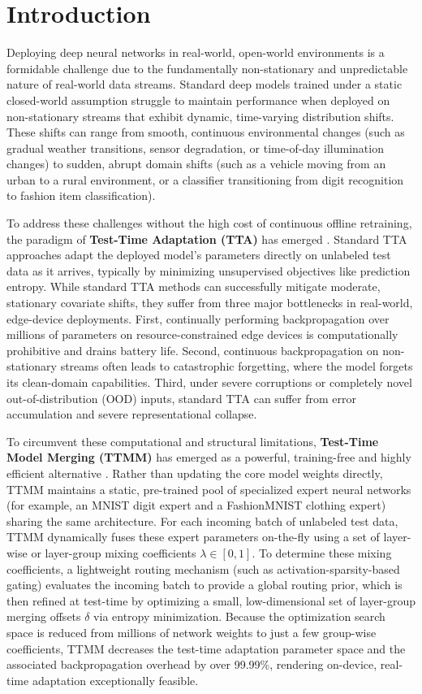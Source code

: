 \documentclass{article}
\theoremstyle{plain}
\theoremstyle{definition}
\theoremstyle{remark}
\begin{document}
\section{Introduction}
\label{sec:intro}
Deploying deep neural networks in real-world, open-world environments is a formidable challenge due to the fundamentally non-stationary and unpredictable nature of real-world data streams. Standard deep models trained under a static closed-world assumption struggle to maintain performance when deployed on non-stationary streams that exhibit dynamic, time-varying distribution shifts. These shifts can range from smooth, continuous environmental changes (such as gradual weather transitions, sensor degradation, or time-of-day illumination changes) to sudden, abrupt domain shifts (such as a vehicle moving from an urban to a rural environment, or a classifier transitioning from digit recognition to fashion item classification). 

To address these challenges without the high cost of continuous offline retraining, the paradigm of \textbf{Test-Time Adaptation (TTA)} has emerged \cite{wang2021tent, liang2023comprehensive}. Standard TTA approaches adapt the deployed model's parameters directly on unlabeled test data as it arrives, typically by minimizing unsupervised objectives like prediction entropy. While standard TTA methods can successfully mitigate moderate, stationary covariate shifts, they suffer from three major bottlenecks in real-world, edge-device deployments. First, continually performing backpropagation over millions of parameters on resource-constrained edge devices is computationally prohibitive and drains battery life. Second, continuous backpropagation on non-stationary streams often leads to catastrophic forgetting, where the model forgets its clean-domain capabilities. Third, under severe corruptions or completely novel out-of-distribution (OOD) inputs, standard TTA can suffer from error accumulation and severe representational collapse.

To circumvent these computational and structural limitations, \textbf{Test-Time Model Merging (TTMM)} has emerged as a powerful, training-free and highly efficient alternative \cite{sam_ttmm}. Rather than updating the core model weights directly, TTMM maintains a static, pre-trained pool of specialized expert neural networks (for example, an MNIST digit expert and a FashionMNIST clothing expert) sharing the same architecture. For each incoming batch of unlabeled test data, TTMM dynamically fuses these expert parameters on-the-fly using a set of layer-wise or layer-group mixing coefficients $\lambda \in [0, 1]$. To determine these mixing coefficients, a lightweight routing mechanism (such as activation-sparsity-based gating) evaluates the incoming batch to provide a global routing prior, which is then refined at test-time by optimizing a small, low-dimensional set of layer-group merging offsets $\delta$ via entropy minimization. Because the optimization search space is reduced from millions of network weights to just a few group-wise coefficients, TTMM decreases the test-time adaptation parameter space and the associated backpropagation overhead by over 99.99\%, rendering on-device, real-time adaptation exceptionally feasible.
\end{document}
